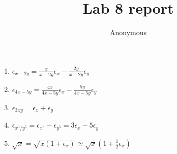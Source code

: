 \documentclass{article}
\title{Lab 8 report}
\author{Anonymous}
\begin{document}
\maketitle
\section{}
\begin{enumerate}[label=(\alph*)]
	\item $\epsilon_{x-2y} = \frac{x}{x-2y}\epsilon_x -
		      \frac{2y}{x-2y}\epsilon_y$
	\item $\epsilon_{4x-5y} = \frac{4x}{4x-5y}\epsilon_x -
		      \frac{5y}{4x-5y}\epsilon_y$
	\item $\epsilon_{3xy} = \epsilon_x + \epsilon_y$
	\item $\epsilon_{{x^3}/{y^5}} =
		      \epsilon_{x^3} - \epsilon_{y^5} =
		      3\epsilon_x - 5\epsilon_y$
	\item
	      $\widetilde{\sqrt{x}} = \sqrt{x(1+\epsilon_x)} \simeq \sqrt{x} (1 + \frac{1}{2} \epsilon_x)$


\end{enumerate}
\end{document}
